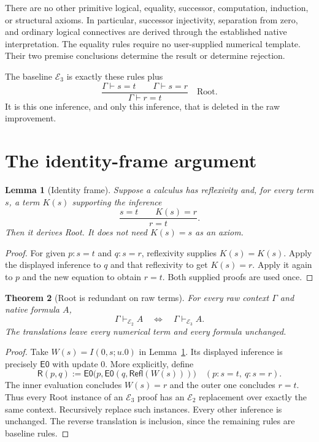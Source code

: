 \documentclass[11pt]{article}
\newtheorem{theorem}{Theorem}[section]
\newtheorem{lemma}[theorem]{Lemma}
\theoremstyle{definition}\newtheorem{definition}[theorem]{Definition}
\newcommand{\Ethree}{\mathcal E_3}
\newcommand{\Rtwo}{\mathcal E_2}
\newcommand{\Refl}{\mathsf{Refl}}
\newcommand{\evz}{\mathsf{E0}}
\newcommand{\RC}{\mathsf{R}}
\begin{document}
There are no other primitive logical, equality, successor, computation,
induction, or structural axioms. In particular, successor injectivity,
separation from zero, and ordinary logical connectives are derived through
the established native interpretation. The equality rules require no
user-supplied numerical template. Their two premise conclusions determine
the result or determine rejection.

The baseline $\Ethree$ is exactly these rules plus
\[
 \frac{\Gamma\vdash s=t\qquad\Gamma\vdash s=r}
      {\Gamma\vdash r=t}\quad\mathrm{Root}.
 \tag{Root}\label{eq:root}
\]
It is this one inference, and only this inference, that is deleted in
the raw improvement.

\section{The identity-frame argument}
\label{sec:frame}

\begin{lemma}[Identity frame]\label{lem:frame}
Suppose a calculus has reflexivity and, for every term $s$, a term
$K(s)$ supporting the inference
\[
 \frac{s=t\qquad K(s)=r}{r=t}.
\]
Then it derives Root. It does not need $K(s)=s$ as an axiom.
\end{lemma}
\begin{proof}
For given $p:s=t$ and $q:s=r$, reflexivity supplies
$K(s)=K(s)$. Apply the displayed inference to $q$ and that reflexivity
to get $K(s)=r$. Apply it again to $p$ and the new equation to obtain
$r=t$. Both supplied proofs are used once.
\end{proof}

\begin{theorem}[Root is redundant on raw terms]\label{thm:raw}
For every raw context $\Gamma$ and native formula $A$,
\[
 \Gamma\vdash_{\Rtwo}A\quad\Longleftrightarrow\quad
 \Gamma\vdash_{\Ethree}A.
\]
The translations leave every numerical term and every formula unchanged.
\end{theorem}
\begin{proof}
Take $W(s)=I(0,s;u.0)$ in Lemma~\ref{lem:frame}. Its displayed inference
is precisely $\evz$ with update $0$. More explicitly, define
\[
 \RC(p,q):=\evz\bigl(p,\evz(q,\Refl(W(s)))\bigr)
 \quad(p:s=t,\ q:s=r).
\]
The inner evaluation concludes $W(s)=r$ and the outer one concludes
$r=t$. Thus every Root instance of an $\Ethree$ proof has an
$\Rtwo$ replacement over exactly the same context. Recursively replace
such instances. Every other inference is unchanged. The reverse
translation is inclusion, since the remaining rules are baseline rules.
\end{proof}
\end{document}

